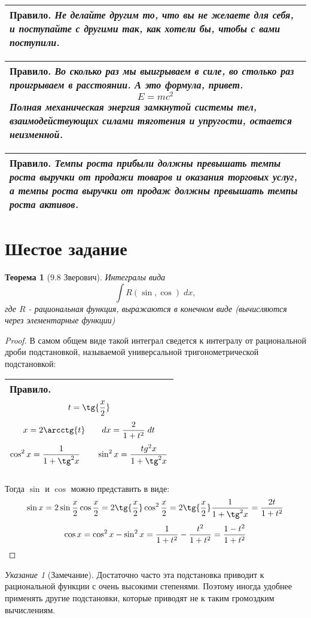\documentclass[a4paper,11pt]{article} %
\newenvironment{pravilo}{\begin{center} \begin{tabular}{|p{0.6 \textwidth}|} \hline \textbf{Правило.} \em}{ \\ \hline \end{tabular} \end{center}}
\theoremstyle{plain}
\newtheorem{theorem}{Теорема}[section]
\theoremstyle{plain}
\theoremstyle{remark}
\newtheorem*{directive}{Указание}
\begin{document}
		\begin{pravilo}
			Не делайте другим то, что вы не желаете для себя, и поступайте с другими так, как хотели бы, чтобы с вами поступили.
		\end{pravilo}
	
		\begin{pravilo}
			Во сколько раз мы выигрываем в силе, во столько раз проигрываем в расстоянии. А это формула, привет.
			$$ E = m c^2 $$
			Полная механическая энергия замкнутой системы тел, взаимодействующих силами тяготения и упругости, остается неизменной.
		\end{pravilo}
	
		\begin{pravilo}
			Темпы роста прибыли должны превышать темпы роста выручки от продажи товаров и оказания торговых услуг, а темпы роста выручки от продаж должны превышать темпы роста активов.
		\end{pravilo}
	
		\section{Шестое задание}
		
		\begin{theorem}[9.8 Зверович]
			Интегралы вида
			$$\displaystyle \int R \left( \sin , \cos \right) \; dx,$$
			где $R$ - рациональная функция, выражаются в конечном виде (вычисляются через элементарные функции)
		\end{theorem}
	
		\begin{proof}
			В самом общем виде такой интеграл сведется к интегралу от рациональной дроби подстановкой, называемой универсальной тригонометрической подстановкой:
			\begin{pravilo}
				$$t = \tg{\dfrac{x}{2}}$$
				$$x = 2 \arcctg{t} \qquad dx = \dfrac{2}{1 + t^2} \; dt$$
				$$\cos^2{x} = \dfrac{1}{1 + \tg^2{x}} \qquad \sin^2{x} = \dfrac{tg^2{x}}{1 + \tg^2{x}}$$
			\end{pravilo}
			Тогда $\sin$ и $\cos$ можно представить в виде:
			$$
				\sin{x} = 2 \sin{\dfrac{x}{2}} \cos{\dfrac{x}{2}} = 2 \tg{\dfrac{x}{2}} \cos^2{\dfrac{x}{2}} = 2 \tg{\dfrac{x}{2}} \dfrac{1}{1 + \tg^2{x}} = \dfrac{2t}{1 + t^2}
			$$
			$$
			\cos{x} = \cos^2{x} - \sin^2{x} = \dfrac{1}{1 + t^2} - \dfrac{t^2}{1 + t^2} = \dfrac{1 - t^2}{1 + t^2}
			\qedhere
			$$
		\end{proof}
	
		\begin{directive}[Замечание]
			Достаточно часто эта подстановка приводит к рациональной функции с очень высокими степенями. Поэтому иногда удобнее применять другие подстановки, которые приводят не к таким громоздким вычислениям.
		\end{directive}
	
\end{document}
